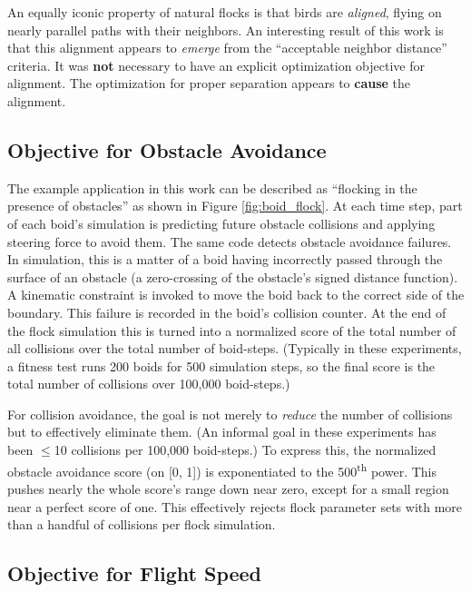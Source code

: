 \documentclass[letterpaper]{article}
\begin{document}
An equally iconic property of natural flocks is that birds are \textit{aligned}, flying on nearly parallel paths with their neighbors. An interesting result of this work is that this alignment appears to \textit{emerge} from the ``acceptable neighbor distance'' criteria. It was \textbf{not} necessary to have an explicit optimization objective for alignment. The optimization for proper separation appears to \textbf{cause} the alignment.

\subsection{Objective for Obstacle Avoidance}
\label{subsec:avoidance_objective}

The example application in this work can be described as ``flocking in the presence of obstacles'' as shown in Figure \ref{fig:boid_flock}. At each time step, part of each boid's simulation is predicting future obstacle collisions and applying steering force to avoid them. The same code detects obstacle avoidance failures. In simulation, this is a matter of a boid having incorrectly passed through the surface of an obstacle (a zero-crossing of the obstacle's signed distance function). A kinematic constraint is invoked to move the boid back to the correct side of the boundary. This failure is recorded in the boid's collision counter. At the end of the flock simulation this is turned into a normalized score of the total number of all collisions over the total number of boid-steps. (Typically in these experiments, a fitness test runs 200 boids for 500 simulation steps, so the final score is the total number of collisions over 100,000 boid-steps.) 

For collision avoidance, the goal is not merely to \textit{reduce} the number of collisions but to effectively eliminate them. (An informal goal in these experiments has been {$\leq$}10 collisions per 100,000 boid-steps.) To express this, the normalized obstacle avoidance score (on [0, 1]) is exponentiated to the 500\textsuperscript{th} power. This pushes nearly the whole score's range down near zero, except for a small region near a perfect score of one. This effectively rejects flock parameter sets with more than a handful of collisions per flock simulation.

\subsection{Objective for Flight Speed}
\label{subsec:speed_objective}
\end{document}
